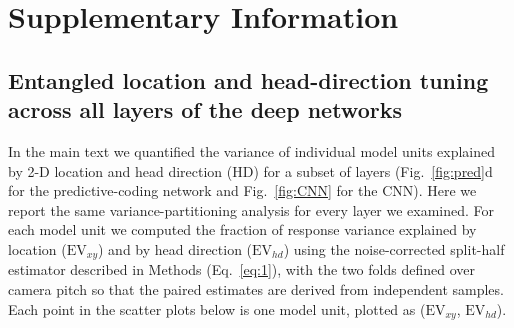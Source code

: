\documentclass[11pt]{article}
\begin{document}




\newpage


\small{


}


\clearpage
\section*{Supplementary Information}

\setcounter{figure}{0}
\renewcommand{\thefigure}{S\arabic{figure}}

\subsection*{Entangled location and head-direction tuning across all layers of the deep networks}

In the main text we quantified the variance of individual model units explained by 2-D location and head direction (HD) for a subset of layers (Fig.~\ref{fig:pred}d for the predictive-coding network and Fig.~\ref{fig:CNN} for the CNN). Here we report the same variance-partitioning analysis for every layer we examined. For each model unit we computed the fraction of response variance explained by location ($\mathrm{EV}_{xy}$) and by head direction ($\mathrm{EV}_{hd}$) using the noise-corrected split-half estimator described in Methods (Eq.~\ref{eq:1}), with the two folds defined over camera pitch so that the paired estimates are derived from independent samples. Each point in the scatter plots below is one model unit, plotted as ($\mathrm{EV}_{xy}$, $\mathrm{EV}_{hd}$).
\end{document}
